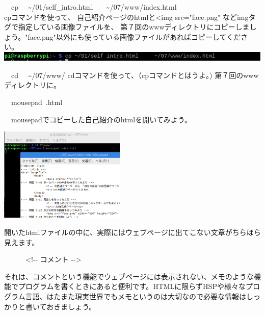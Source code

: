 \documentclass[a4paper,12pt,dvipdfmx]{jarticle}
\begin{document}
\begin{minipage}[b]{0.5\textwidth}
	\begin{enumerate}
		\begin{minipage}[b]{1.5\textwidth}
			\item \ \ cp \ \ {\textasciitilde}/01/self\_intro.html \ \ \ {\textasciitilde}/07/www/index.html\\
			cpコマンドを使って、 自己紹介ページのhtmlと<img src="face.png" などimgタグで指定している画像ファイルを、 第７回のwwwディレクトリにコピーしましょう。"face.png"以外にも使っている画像ファイルがあればコピーしてください。\\
			\includegraphics[width=14.73cm]{ome7-img033.png}
			\bigskip
		\end{minipage}

		\bigskip

		\item

		      \ \ cd \ \ {\textasciitilde}/07/www/\newline
		      cdコマンドを使って、（cpコマンドとはうよ。) 第７回のwwwディレクトリに。


		\item \ \ mousepad\ \index.html

		      \ \ mousepadでコピーした自己紹介のhtmlを開いてみよう。

	\end{enumerate}
\end{minipage}
\includegraphics[width=0.45\textwidth]{ome7-img034.png}

\bigskip

開いたhtmlファイルの中に、実際にはウェブページに出てこない文章がちらほら見えます。

\ \ \ \ \ \ {\textless}!-{}- コメント -{}-{\textgreater}

それは、コメントという機能でウェブページには表示されない、メモのような機能でプログラムを書くときにあると便利です。HTMLに限らずHSPや様々なプログラム言語、はたまた現実世界でもメモというのは大切なので必要な情報はしっかりと書いておきましょう。
\end{document}
